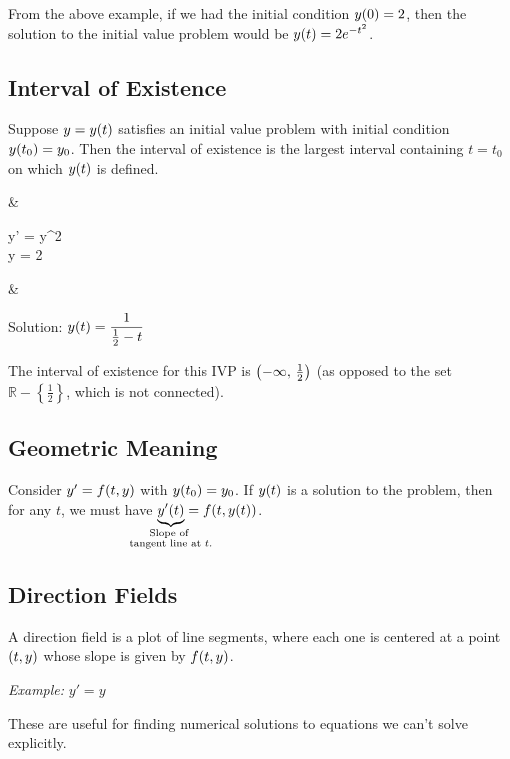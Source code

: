From the above example, if we had the initial condition $y\p{0} = 2$, then the solution to the initial value problem would be $y\p{t} = 2e^{-t^2}$.

\pagebreak
\subsection{Interval of Existence}
\begin{definition}
	Suppose $y = y\p{t}$ satisfies an initial value problem with initial condition $y\p{t_0} = y_0$. Then the interval of existence is the largest interval containing $t = t_0$ on which $y\p{t}$ is defined.
\end{definition}
\begin{example}
	\vspace{-0.5\baselineskip}
	\begin{flalign*}
		&
		\begin{cases}
			y' = y^2 \\
			y = 2
		\end{cases}
		&
	\end{flalign*}
	Solution: $\displaystyle y\p{t} = \frac{1}{\frac{1}{2} - t}$
	
	The interval of existence for this IVP is $\p{-\infty, \, \frac{1}{2}}$ (as opposed to the set $\mathbb{R} - \left\{ \frac{1}{2} \right\}$, which is not connected).
\end{example}

\subsection{Geometric Meaning}
Consider $y' = f\p{t, y}$ with $y\p{t_0} = y_0$. If $y\p{t}$ is a solution to the problem, then for any $t$, we must have $\underbrace{y'\p{t}}_{\mathclap{\substack{\text{Slope of } \\ \text{tangent line at }t.}}} = f\p{t, y\p{t}}$.

\subsection{Direction Fields}
\begin{definition}
	A direction field is a plot of line segments, where each one is centered at a point $\p{t, y}$ whose slope is given by $f\p{t, y}$.
\end{definition}
\textit{Example:} $y' = y$
\par
{}
\par
These are useful for finding numerical solutions to equations we can't solve explicitly.

